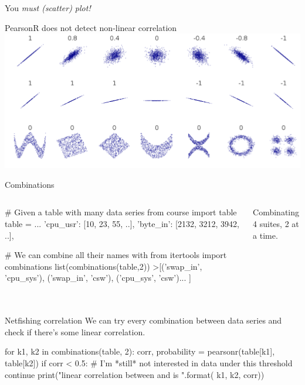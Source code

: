 \begin{pyframe}{You \emph{must (scatter) plot!}}
\LARGE
\begin{center}
PearsonR does not detect non-linear correlation \\
\includegraphics[width=.8\textwidth]{correlation.pdf} \\
\end{center}
\end{pyframe}


\begin{pyframe}{Combinations } %
\begin{columns}
\begin{pycode}
# Given a table with many data series
from course import table
table = {...
  'cpu_usr': [10, 23, 55, ..],
  'byte_in': [2132, 3212, 3942, ..], }

# We can combine all their names with
from itertools import combinations
list(combinations(table,2))
>[('swap_in', 'cpu_sys'),
 ('swap_in', 'csw'),  ('cpu_sys', 'csw')... ]








\end{pycode}
Combinating 4 suites, 2 at a time.
\hearts \spades \\
\hearts \clubs \\
\hearts \diamonds \\
\spades \clubs \\
\spades \diamonds \\
\clubs \diamonds \\


\end{columns}
\end{pyframe}


\begin{pyframe}{Netfishing correlation}
We can try every combination between data series and check if there's some linear correlation.
\begin{pycode}
for k1, k2 in combinations(table, 2):
  corr, probability = pearsonr(table[k1], table[k2])
  if corr < 0.5:
    # I'm *still* not interested in data under this threshold
    continue
  print("linear correlation between {} and {} is {}".format(
    k1, k2, corr))

\end{pycode}
\end{pyframe}

